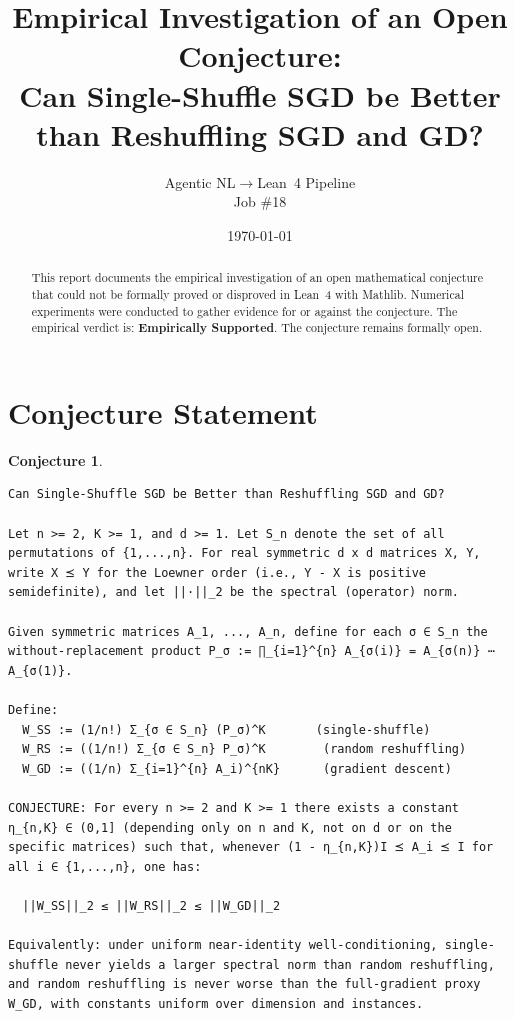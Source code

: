 \documentclass[11pt]{article}
\title{Empirical Investigation of an Open Conjecture:\\
Can Single-Shuffle SGD be Better than Reshuffling SGD and GD?}
\author{Agentic NL$\to$Lean~4 Pipeline \\ \small Job \#18}
\date{\today}
\newtheorem{conjecture}{Conjecture}
\begin{document}
\maketitle

\begin{abstract}
This report documents the empirical investigation of an open mathematical conjecture
that could not be formally proved or disproved in Lean~4 with Mathlib.
Numerical experiments were conducted to gather evidence for or against the conjecture.
The empirical verdict is: \textbf{\textcolor{green!70!black}{Empirically Supported}}.
The conjecture remains formally open.
\end{abstract}

\section{Conjecture Statement}

\begin{conjecture}
\begin{lstlisting}
Can Single-Shuffle SGD be Better than Reshuffling SGD and GD?

Let n >= 2, K >= 1, and d >= 1. Let S_n denote the set of all permutations of {1,...,n}. For real symmetric d x d matrices X, Y, write X ⪯ Y for the Loewner order (i.e., Y - X is positive semidefinite), and let ||·||_2 be the spectral (operator) norm.

Given symmetric matrices A_1, ..., A_n, define for each σ ∈ S_n the without-replacement product P_σ := ∏_{i=1}^{n} A_{σ(i)} = A_{σ(n)} ⋯ A_{σ(1)}.

Define:
  W_SS := (1/n!) Σ_{σ ∈ S_n} (P_σ)^K       (single-shuffle)
  W_RS := ((1/n!) Σ_{σ ∈ S_n} P_σ)^K        (random reshuffling)
  W_GD := ((1/n) Σ_{i=1}^{n} A_i)^{nK}      (gradient descent)

CONJECTURE: For every n >= 2 and K >= 1 there exists a constant η_{n,K} ∈ (0,1] (depending only on n and K, not on d or on the specific matrices) such that, whenever (1 - η_{n,K})I ⪯ A_i ⪯ I for all i ∈ {1,...,n}, one has:

  ||W_SS||_2 ≤ ||W_RS||_2 ≤ ||W_GD||_2

Equivalently: under uniform near-identity well-conditioning, single-shuffle never yields a larger spectral norm than random reshuffling, and random reshuffling is never worse than the full-gradient proxy W_GD, with constants uniform over dimension and instances.
\end{lstlisting}
\end{conjecture}
\end{document}
